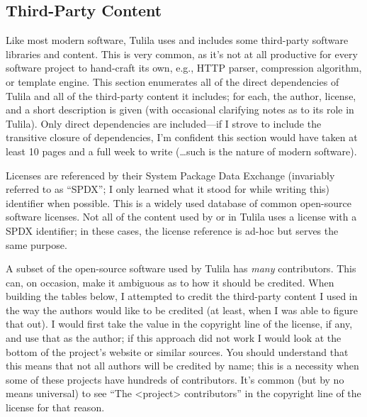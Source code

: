 \documentclass[12pt]{article}
\begin{document}
\newpage
\begin{landscape}

\section{Third-Party Content}
\label{section:third-party-content}

Like most modern software, Tulila uses and includes some third-party software libraries and content. This is very common, as it's not at all productive for every software project to hand-craft its own, e.g., HTTP parser, compression algorithm, or template engine. This section enumerates all of the direct dependencies of Tulila and all of the third-party content it includes; for each, the author, license, and a short description is given (with occasional clarifying notes as to its role in Tulila). Only direct dependencies are included---if I strove to include the transitive closure of dependencies, I'm confident this section would have taken at least 10 pages and a full week to write (\dots{}such is the nature of modern software).


Licenses are referenced by their System Package Data Exchange (invariably referred to as ``SPDX''; I only learned what it stood for while writing this) identifier when possible. This is a widely used database of common open-source software licenses. Not all of the content used by or in Tulila uses a license with a SPDX identifier; in these cases, the license reference is ad-hoc but serves the same purpose.

A subset of the open-source software used by Tulila has \textit{many} contributors. This can, on occasion, make it ambiguous as to how it should be credited. When building the tables below, I attempted to credit the third-party content I used in the way the authors would like to be credited (at least, when I was able to figure that out). I would first take the value in the copyright line of the license, if any, and use that as the author; if this approach did not work I would look at the bottom of the project's website or similar sources. You should understand that this means that not all authors will be credited by name; this is a necessity when some of these projects have hundreds of contributors. It's common (but by no means universal) to see ``The <project> contributors'' in the copyright line of the license for that reason.


\end{landscape}
\end{document}
